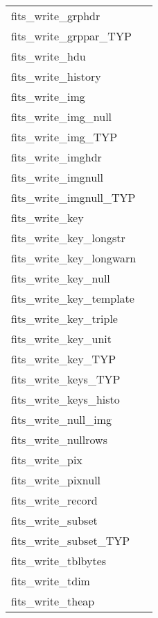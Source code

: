 \documentclass[11pt]{book}
\begin{document}
\begin{tabular}{lr}
fits\_write\_grphdr       & \pageref{ffphpr} \\
fits\_write\_grppar\_TYP & \pageref{ffpgpx} \\
fits\_write\_hdu       & \pageref{ffwrhdu} \\
fits\_write\_history      & \pageref{ffphis} \\
fits\_write\_img        & \pageref{ffppr} \\
fits\_write\_img\_null & \pageref{ffppru} \\
fits\_write\_img\_TYP    & \pageref{ffpprx} \\
fits\_write\_imghdr       & \pageref{ffphps} \\
fits\_write\_imgnull     & \pageref{ffppn} \\
fits\_write\_imgnull\_TYP & \pageref{ffppnx} \\
fits\_write\_key          & \pageref{ffpky} \\
fits\_write\_key\_longstr  & \pageref{ffpkls} \\
fits\_write\_key\_longwarn & \pageref{ffplsw} \\
fits\_write\_key\_null     & \pageref{ffpkyu} \\
fits\_write\_key\_template & \pageref{ffpktp} \\
fits\_write\_key\_triple   & \pageref{ffpkyt} \\
fits\_write\_key\_unit     & \pageref{ffpunt} \\
fits\_write\_key\_TYP      & \pageref{ffpkyx} \\
fits\_write\_keys\_TYP     & \pageref{ffpknx} \\
fits\_write\_keys\_histo   & \pageref{writekeyshisto} \\
fits\_write\_null\_img    & \pageref{ffpprn} \\
fits\_write\_nullrows      & \pageref{ffpclu} \\
fits\_write\_pix          & \pageref{ffppx} \\
fits\_write\_pixnull      & \pageref{ffppxn} \\
fits\_write\_record       & \pageref{ffprec} \\
fits\_write\_subset       & \pageref{ffpss} \\
fits\_write\_subset\_TYP  & \pageref{ffpssx} \\
fits\_write\_tblbytes  & \pageref{ffptbb} \\
fits\_write\_tdim         & \pageref{ffptdm} \\
fits\_write\_theap    & \pageref{ffpthp} \\
\end{tabular}
\end{document}
